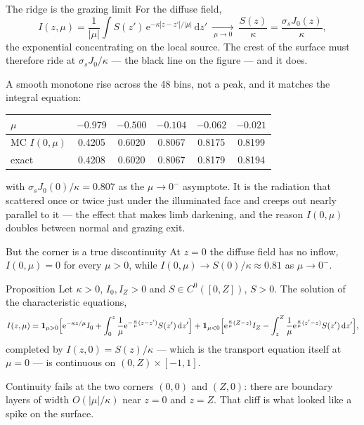 \documentclass[aspectratio=169,10pt]{beamer}
\renewcommand{\d}{\,\mathrm{d}}
\newcommand{\e}{\mathrm{e}}
\begin{document}
\begin{frame}{The ridge is the grazing limit}
For the diffuse field,
\[
I(z,\mu)=\frac1{|\mu|}\int S(z')\,\e^{-\kappa|z-z'|/|\mu|}\d z'
\ \xrightarrow[\ \mu\to0\ ]{}\ \frac{S(z)}{\kappa}=\frac{\sigma_sJ_0(z)}{\kappa},
\]
the exponential concentrating on the local source. The crest of the surface must therefore
ride at $\sigma_sJ_0/\kappa$ --- the black line on the figure --- and it does.
\medskip

A smooth monotone rise across the 48 bins, not a peak, and it matches the integral equation:
\begin{center}\small
\begin{tabular}{lccccc}\toprule
$\mu$ & $-0.979$ & $-0.500$ & $-0.104$ & $-0.062$ & $-0.021$\\\midrule
MC $I(0,\mu)$ & 0.4205 & 0.6020 & 0.8067 & 0.8175 & 0.8199\\
exact         & 0.4208 & 0.6020 & 0.8067 & 0.8179 & 0.8194\\\bottomrule
\end{tabular}
\end{center}
\medskip

with $\sigma_sJ_0(0)/\kappa=0.807$ as the $\mu\to0^-$ asymptote. It is the radiation that
scattered once or twice just under the illuminated face and creeps out nearly parallel to
it --- the effect that makes limb darkening, and the reason $I(0,\mu)$ doubles between
normal and grazing exit.
\end{frame}

\begin{frame}{But the corner is a true discontinuity}
At $z=0$ the diffuse field has no inflow, $I(0,\mu)=0$ for every $\mu>0$, while
$I(0,\mu)\to S(0)/\kappa\approx0.81$ as $\mu\to0^-$.
\begin{block}{Proposition}
Let $\kappa>0$, $I_0,I_Z>0$ and $S\in C^0([0,Z])$, $S>0$. The solution of the
characteristic equations,
\[
I(z,\mu)={\bf 1}_{\mu>0}\Big[\e^{-\kappa z/\mu}I_0+\int_0^z\frac1\mu
\e^{-\frac\kappa\mu(z-z')}S(z')\d z'\Big]
+{\bf 1}_{\mu<0}\Big[\e^{\frac\kappa\mu(Z-z)}I_Z-\int_z^Z\frac1\mu
\e^{\frac\kappa\mu(z'-z)}S(z')\d z'\Big],
\]
completed by $I(z,0)=S(z)/\kappa$ --- which is the transport equation itself at $\mu=0$ ---
is continuous on $(0,Z)\times[-1,1]$.
\end{block}
Continuity fails at the two corners $(0,0)$ and $(Z,0)$: there are boundary layers of width
$O(|\mu|/\kappa)$ near $z=0$ and $z=Z$. That cliff is what looked like a spike on the
surface.
\end{frame}
\end{document}
